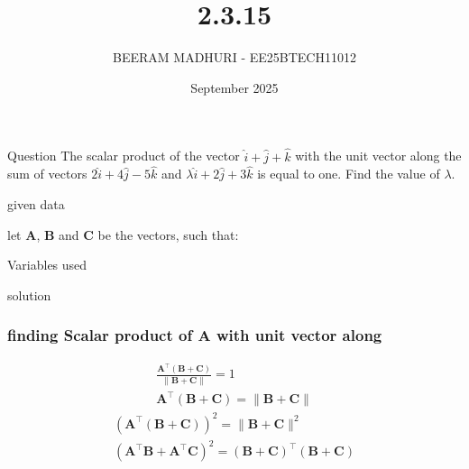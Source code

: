 \documentclass{beamer}
\title %
{2.3.15}
\date{September  2025}
\author %
{BEERAM MADHURI - EE25BTECH11012}
\begin{document}
\frame{\titlepage}
\begin{frame}{Question}
The scalar product of the vector $\hat{i}+\hat{j}+\hat{k}$ with the unit vector along the sum of vectors $2\hat{i} + 4\hat{j} - 5\hat{k}$ and $\lambda \hat{i} + 2\hat{j} + 3\hat{k}$ is equal to one. Find the value of $\lambda$.
 
\end{frame}
 
\begin{frame}{given data}
 
\text let $\mathbf{A}$, $\mathbf{B}$ and $\mathbf{C}$ be the vectors, such that:
\begin{table}[h!]
    \centering
    
    \caption{Variables used}
    \label{table 2.3.15}
\end{table}
\end{frame}
 
\begin{frame}{solution}
\frametitle{finding Scalar product of $\mathbf{A}$ with unit vector along }
\begin{align}
 \frac{\mathbf{A^\top} (\mathbf{B}+\mathbf{C})}{\|\mathbf{B}+\mathbf{C}\|} = 1\\
\mathbf{A^\top} (\mathbf{B}+\mathbf{C}) = \|\mathbf{B}+\mathbf{C}\|
\end{align}
\begin{align}
(\mathbf{A^\top} (\mathbf{B}+\mathbf{C}))^2 = \|\mathbf{B}+\mathbf{C}\|^2\\
(\mathbf{A^\top} \mathbf{B} + \mathbf{A^\top} \mathbf{C})^2 = (\mathbf{B}+\mathbf{C})^\top(\mathbf{B}+\mathbf{C})
\end{align}
\end{frame}
\end{document}
